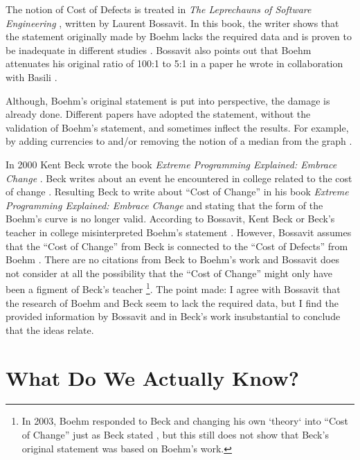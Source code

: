 The notion of Cost of Defects is treated in \textit{The Leprechauns of Software Engineering} \autocite{bossavit2013leprechauns}, written by Laurent Bossavit.
In this book, the writer shows that the statement originally made by Boehm lacks the required data and is proven to be inadequate in different studies \autocite[98,102]{bossavit2013leprechauns}.
Bossavit also points out that Boehm attenuates his original ratio of 100:1 to 5:1 in a paper he wrote in collaboration with Basili \autocite[426]{boehm2005software}.

Although, Boehm's original statement is put into perspective, the damage is already done.
Different papers have adopted the statement, without the validation of Boehm's statement, and sometimes inflect the results.
For example, by adding currencies to and/or removing the notion of a median from the graph \autocite{bossavit2013leprechauns}.

In 2000 Kent Beck wrote the book \textit{Extreme Programming Explained: Embrace Change} \autocite{beck2000extreme}.
Beck writes about an event he encountered in college related to the cost of change \autocite[21]{beck2000extreme}.
Resulting Beck to write about ``Cost of Change'' in his book \textit{Extreme Programming Explained: Embrace Change} \autocite{beck2000extreme} and stating that the form of the Boehm's curve is no longer valid.
According to Bossavit, Kent Beck or Beck's teacher in college misinterpreted Boehm's statement \autocite[97]{bossavit2013leprechauns}.
However, Bossavit assumes that the ``Cost of Change'' from Beck is connected to the ``Cost of Defects'' from Boehm \autocite{bossavit2013leprechauns}.
There are no citations from Beck to Boehm's work and Bossavit does not consider at all the possibility that the ``Cost of Change'' might only have been a figment of Beck's teacher
\footnote{In 2003, Boehm responded to Beck and changing his own `theory` into ``Cost of Change'' just as Beck stated \autocite{boehm2003balancing},
but this still does not show that Beck's original statement was based on Boehm's work.}.
The point made: I agree with Bossavit that the research of Boehm and Beck seem to lack the required data,
but I find the provided information by Bossavit and in Beck's work insubstantial to conclude that the ideas relate.

\section*{What Do We Actually Know?}

